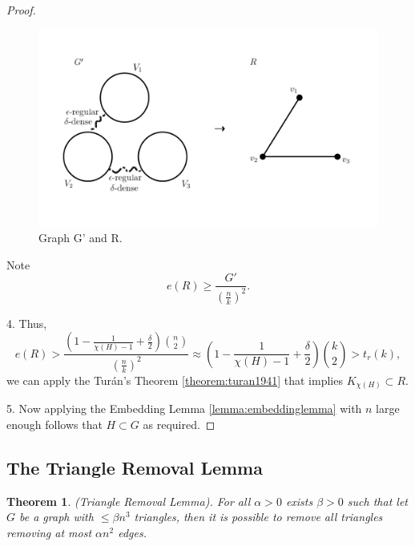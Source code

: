 \documentclass[12pt,twoside,a4paper]{book}
\numberwithin{equation}{section}
\newtheorem{theorem}             {Theorem}[section]
\theoremstyle{remark}
\begin{document}
\begin{proof}
\begin{figure}[H]
     \centering
     \includegraphics[scale=1.5]{Figuras/graph-G'-and-R.jpg}
     \caption{Graph G' and R.}
     \label{fig:graph-G'-and-R}
\end{figure}

Note 
$$e(R) \geq \frac{G'}{\left(\frac{n}{k}\right)^2}.$$

4. Thus,
$$e(R) > \frac{\left(1 - \frac{1}{\chi(H) - 1} + \frac{\delta}{2}\right) \binom{n}{2}}{\left(\frac{n}{k}\right)^2} \approx \left( 1 - \frac{1}{\chi(H) - 1} + \frac{\delta}{2}\right) \binom{k}{2}> t_r(k),$$
we can apply the Turán's Theorem \ref{theorem:turan1941} that implies $K_{\chi (H)} \subset R$.

5. Now applying the Embedding Lemma \ref{lemma:embeddinglemma} with $n$ large enough follows that $H \subset G$ as required.

\end{proof}

\subsection{The Triangle Removal Lemma}

\begin{theorem} \label{lemma:triangleremoval}
(Triangle Removal Lemma). For all $\alpha > 0$ exists $\beta > 0$ such that let $G$ be a graph with $\leq \beta n^3$ triangles, then it is possible to remove all triangles removing at most $\alpha n^2$ edges. 
\end{theorem}
\end{document}
